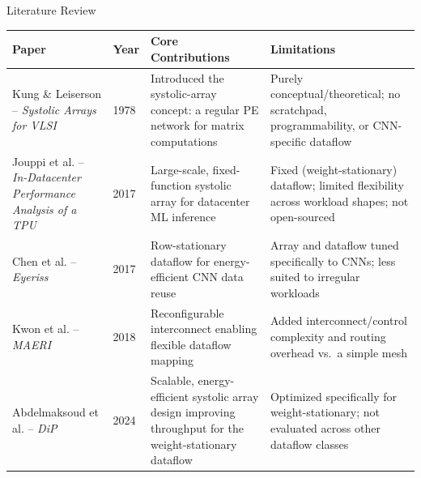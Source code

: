 \documentclass[aspectratio=169,10pt]{beamer}
\begin{document}
\begin{frame}{Literature Review}
  \footnotesize
  \renewcommand{\arraystretch}{1.15}
  \begin{tabular}{p{2.6cm}p{1.5cm}p{4.1cm}p{4.1cm}}
    \toprule
    \textbf{Paper} & \textbf{Year} & \textbf{Core Contributions} & \textbf{Limitations} \\
    \midrule
    Kung \& Leiserson -- \textit{Systolic Arrays for VLSI} &
    1978 &
    Introduced the systolic-array concept: a regular PE network for matrix computations &
    Purely conceptual/theoretical; no scratchpad, programmability, or CNN-specific dataflow \\[4pt]

    Jouppi et al. -- \textit{In-Datacenter Performance Analysis of a TPU} &
    2017 &
    Large-scale, fixed-function systolic array for datacenter ML inference &
    Fixed (weight-stationary) dataflow; limited flexibility across workload shapes; not open-sourced \\[4pt]

    Chen et al. -- \textit{Eyeriss} &
    2017 &
    Row-stationary dataflow for energy-efficient CNN data reuse &
    Array and dataflow tuned specifically to CNNs; less suited to irregular workloads \\[4pt]

    Kwon et al. -- \textit{MAERI} &
    2018 &
    Reconfigurable interconnect enabling flexible dataflow mapping &
    Added interconnect/control complexity and routing overhead vs.\ a simple mesh \\[4pt]

     Abdelmaksoud et al. -- \textit{DiP} &
    2024 &
    Scalable, energy-efficient systolic array design improving throughput for the weight-stationary dataflow &
    Optimized specifically for weight-stationary; not evaluated across other dataflow classes \\[4pt]
    \bottomrule
  \end{tabular}
\end{frame}
\end{document}
